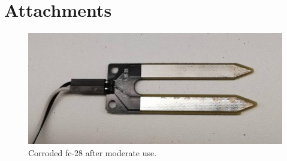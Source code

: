 \documentclass{article}
\begin{document}
\section{Attachments}
\begin{figure}
  \centering
      \includegraphics{fc-28-corrosion}
  \caption{Corroded fc-28 after moderate use.}
\end{figure}


\pagebreak
{}

\nocite{*}
% 
\end{document}
